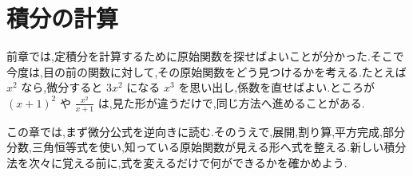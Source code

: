 \chapter{積分の計算}\label{章:基本積分}

前章では,定積分を計算するために原始関数を探せばよいことが分かった.そこで今度は,目の前の関数に対して,その原始関数をどう見つけるかを考える.たとえば $x^2$ なら,微分すると $3x^2$ になる $x^3$ を思い出し,係数を直せばよい.ところが $(x+1)^2$ や $\frac{x^2}{x+1}$ は,見た形が違うだけで,同じ方法へ進めることがある.

この章では,まず微分公式を逆向きに読む.そのうえで,展開,割り算,平方完成,部分分数,三角恒等式を使い,知っている原始関数が見える形へ式を整える.新しい積分法を次々に覚える前に,式を変えるだけで何ができるかを確かめよう.

%
%
%
%
%
%
%
